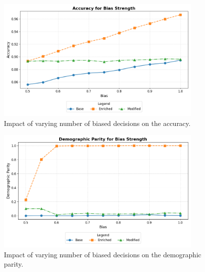 \begin{figure}[h!]
    \centering
    \includegraphics[width=0.9\textwidth]{gfx/ablation_decisions_accuracy.png}
    \caption{Impact of varying number of biased decisions on the accuracy.}
    \label{fig:ablation_bias_accuracy}
\end{figure}

\begin{figure}[h!]
    \centering
    \includegraphics[width=0.9\textwidth]{gfx/ablation_decisions_fairness.png}
    \caption{Impact of varying number of biased decisions on the demographic parity.}
    \label{fig:ablation_bias_fairness}
\end{figure}


